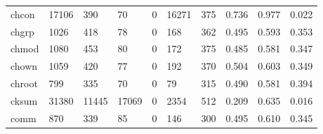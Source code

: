 \begin{longtable}{lp{1.3cm}p{1.3cm}p{1.3cm}p{1.3cm}p{1.3cm}p{1.3cm}p{1.3cm}p{1.3cm}p{1.3cm}}
chcon     &                  17106 &                                390 &                                70 &                                0 &                             16271 &                             375 &                                0.736 &                                  0.977 &                                0.022 \\
chgrp     &                   1026 &                                418 &                                78 &                                0 &                               168 &                             362 &                                0.495 &                                  0.593 &                                0.353 \\
chmod     &                   1080 &                                453 &                                80 &                                0 &                               172 &                             375 &                                0.485 &                                  0.581 &                                0.347 \\
chown     &                   1059 &                                420 &                                77 &                                0 &                               192 &                             370 &                                0.504 &                                  0.603 &                                0.349 \\
chroot    &                    799 &                                335 &                                70 &                                0 &                                79 &                             315 &                                0.490 &                                  0.581 &                                0.394 \\
cksum     &                  31380 &                              11445 &                             17069 &                                0 &                              2354 &                             512 &                                0.209 &                                  0.635 &                                0.016 \\
comm      &                    870 &                                339 &                                85 &                                0 &                               146 &                             300 &                                0.495 &                                  0.610 &                                0.345 \\

\end{longtable}
